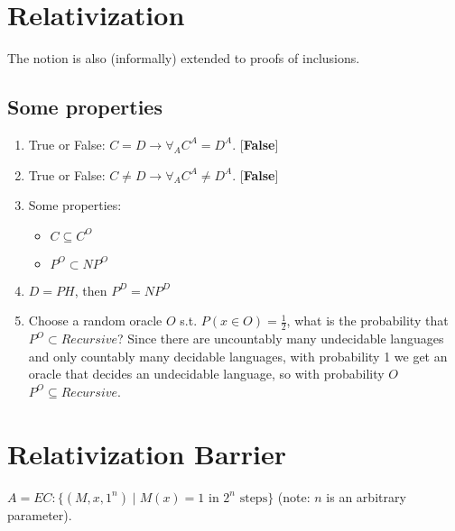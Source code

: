 \documentclass[11pt]{article} %
\begin{document}
\section{Relativization}


The notion is also (informally) extended to proofs of inclusions.


\subsection{Some properties}

\begin{enumerate}
\item True or False: $C = D \rightarrow \forall_A C^A = D^A$. [{\bf False}]
\item True or False: $C \neq D \rightarrow \forall_A C^A \neq D^A$. [{\bf False}]
\item Some properties:
\begin{itemize}
\item $C \subseteq C^O$
\item $P^O \subset NP^O$
\end{itemize}
\item $D = PH$, then $P^D = NP^D$
\item Choose a random oracle $O$ s.t. $P(x \in O) = \frac{1}{2}$, what is the probability that $P^O \subset Recursive$? Since there are uncountably many undecidable languages and only countably many decidable languages, with probability 1 we get an oracle that decides an undecidable language, so with probability $O$ $P^O \subseteq Recursive$.
\end{enumerate}



\section{Relativization Barrier}



 $A = EC : \{(M, x, 1^n) \mid M(x) = 1 \text{ in $2^n$ steps}\}$ (note: $n$ is an arbitrary parameter).
\end{document}
